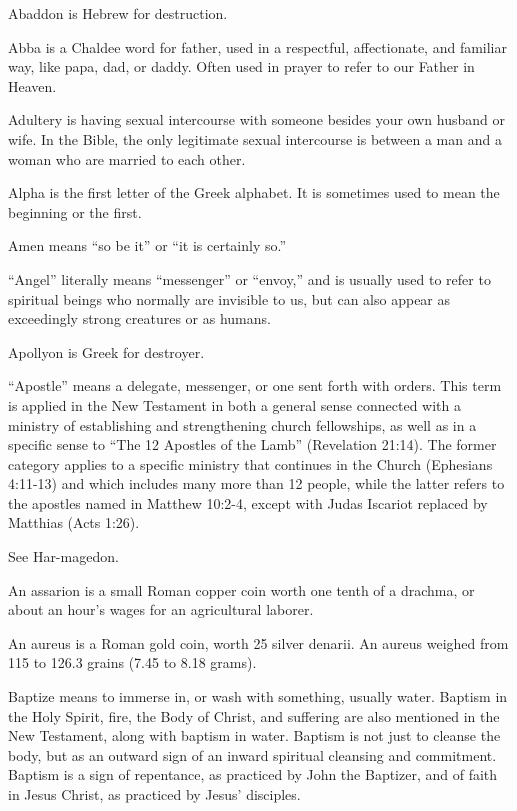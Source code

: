 \begin{multicols}{2}

Abaddon is Hebrew for destruction.

Abba is a Chaldee word for father, used in a respectful,
affectionate, and familiar way, like papa, dad, or daddy. Often used
in prayer to refer to our Father in Heaven.

Adultery is having sexual intercourse with someone besides your own
husband or wife. In the Bible, the only legitimate sexual intercourse
is between a man and a woman who are married to each other.

Alpha is the first letter of the Greek alphabet. It is sometimes used
to mean the beginning or the first.

Amen means {``}so be it{''} or {``}it is certainly so.{''}

{``}Angel{''} literally means {``}messenger{''} or {``}envoy,{''} and
is usually used to refer to spiritual beings who normally are
invisible to us, but can also appear as exceedingly strong creatures
or as humans.

Apollyon is Greek for destroyer.

{``}Apostle{''} means a delegate, messenger, or one sent forth with
orders. This term is applied in the New Testament in both a general
sense connected with a ministry of establishing and strengthening
church fellowships, as well as in a specific sense to {``}The 12
Apostles of the Lamb{''} (Revelation 21:14).  The former category
applies to a specific ministry that continues in the Church
(Ephesians 4:11-13) and which includes many more than 12 people,
while the latter refers to the apostles named in Matthew 10:2-4,
except with Judas Iscariot replaced by Matthias (Acts 1:26).

See Har-magedon.

An assarion is a small Roman copper coin worth one tenth of a
drachma, or about an hour's wages for an agricultural laborer.

An aureus is a Roman gold coin, worth 25 silver denarii. An aureus
weighed from 115 to 126.3 grains (7.45 to 8.18 grams).

Baptize means to immerse in, or wash with something, usually water.
Baptism in the Holy Spirit, fire, the Body of Christ, and suffering
are also mentioned in the New Testament, along with baptism in water.
Baptism is not just to cleanse the body, but as an outward sign of an
inward spiritual cleansing and commitment. Baptism is a sign of
repentance, as practiced by John the Baptizer, and of faith in Jesus
Christ, as practiced by Jesus' disciples.


\end{multicols}

